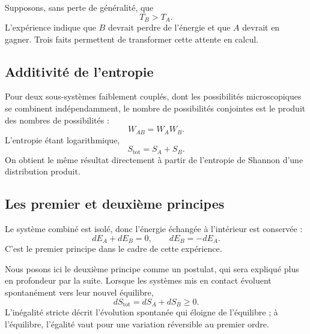 Supposons, sans perte de généralité, que
\begin{equation}
 T_B>T_A.
 \label{eq:sm2-temperature-order}
\end{equation}
L’expérience indique que \(B\) devrait perdre de l’énergie et que \(A\) devrait en gagner. Trois faits permettent de transformer cette attente en calcul.

\subsection{Additivité de l’entropie}

Pour deux sous-systèmes faiblement couplés, dont les possibilités microscopiques se combinent indépendamment, le nombre de possibilités conjointes est le produit des nombres de possibilités :
\[
 W_{AB}=W_AW_B.
\]
L’entropie étant logarithmique,
\begin{equation}
 S_{\mathrm{tot}}=S_A+S_B.
 \label{eq:sm2-entropy-additivity}
\end{equation}
On obtient le même résultat directement à partir de l’entropie de Shannon d’une distribution produit.

\begin{classroomqa}
\end{classroomqa}

\subsection{Les premier et deuxième principes}

Le système combiné est isolé, donc l’énergie échangée à l’intérieur est conservée :
\begin{equation}
 dE_A+dE_B=0,
 \qquad
 dE_B=-dE_A.
 \label{eq:sm2-first-law}
\end{equation}
C’est le premier principe dans le cadre de cette expérience.

Nous posons ici le deuxième principe comme un postulat, qui sera expliqué plus en profondeur par la suite. Lorsque les systèmes mis en contact évoluent spontanément vers leur nouvel équilibre,
\begin{equation}
 dS_{\mathrm{tot}}=dS_A+dS_B\geq0.
 \label{eq:sm2-second-law}
\end{equation}
L’inégalité stricte décrit l’évolution spontanée qui éloigne de l’équilibre ; à l’équilibre, l’égalité vaut pour une variation réversible au premier ordre.

